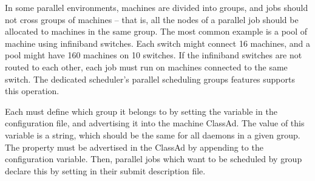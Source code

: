 In some parallel environments, machines are divided into groups, and
jobs should not cross groups of machines -- that is, all the nodes of a parallel
job should be allocated to machines in the same group.  The most common
example is a pool of machine using infiniband switches.  Each switch
might connect 16 machines, and a pool might have 160 machines on 10 switches.
If the infiniband switches are not routed to each other, each job must run 
on machines connected to the same switch.  The dedicated scheduler's 
parallel scheduling groups features supports this operation.

Each  must define which group it belongs to by setting the 
 variable in the configuration file, and 
advertising it into the machine ClassAd.  
The value of this variable is a string,
which should be the same for all  daemons in a given group.
The property must be advertised in the  ClassAd
by appending 
to the  configuration variable.
Then, parallel jobs which want to be scheduled by group declare this
by setting 
in their submit description file. 
